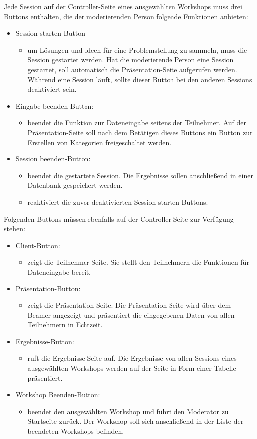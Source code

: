 Jede Session auf der Controller-Seite eines ausgewählten Workshops muss drei Buttons enthalten, die der moderierenden Person folgende Funktionen anbieten:
\begin{itemize}
\item Session starten-Button:
\begin{itemize}
\item um Lösungen und Ideen für eine Problemstellung zu sammeln, muss die Session gestartet werden. Hat die moderierende Person eine Session gestartet, soll automatisch die Präsentation-Seite aufgerufen werden. Während eine Session läuft, sollte dieser Button bei den anderen Sessions deaktiviert sein.
\end{itemize}
\item Eingabe beenden-Button:
\begin{itemize}
\item beendet die Funktion zur Dateneingabe seitens der Teilnehmer. Auf der Präsentation-Seite soll nach dem Betätigen dieses Buttons ein Button zur Erstellen von Kategorien freigeschaltet werden.
\end{itemize}
\item Session beenden-Button:
\begin{itemize}
\item beendet die gestartete Session. Die Ergebnisse sollen anschließend in einer Datenbank gespeichert werden.
\item reaktiviert die zuvor deaktivierten Session starten-Buttons.
\end{itemize}
\end{itemize}

Folgenden Buttons müssen ebenfalls auf der Controller-Seite zur Verfügung stehen:
\begin{itemize}
\item Client-Button:
\begin{itemize}
\item zeigt die Teilnehmer-Seite. Sie stellt den Teilnehmern die Funktionen für Dateneingabe bereit.
\end{itemize}
\item Präsentation-Button:
\begin{itemize}
\item zeigt die Präsentation-Seite. Die Präsentation-Seite wird über dem Beamer angezeigt und präsentiert die eingegebenen Daten von allen Teilnehmern in Echtzeit.
\end{itemize}
\item Ergebnisse-Button:
\begin{itemize}
\item ruft die Ergebnisse-Seite auf. Die Ergebnisse von allen Sessions eines ausgewählten Workshops werden auf der Seite in Form einer Tabelle präsentiert.
\end{itemize}
\item Workshop Beenden-Button:
\begin{itemize}
\item beendet den ausgewählten Workshop und führt den Moderator zu Startseite zurück. Der Workshop soll sich anschließend in der Liste der beendeten Workshops befinden.
\end{itemize}
\end{itemize}

